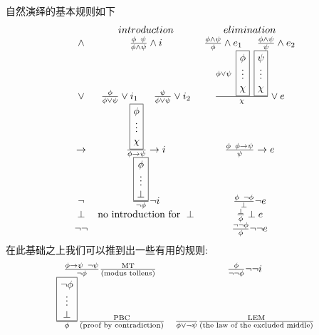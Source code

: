 \documentclass[a4paper,11pt]{article}%
\theoremstyle{remark}
\theoremstyle{remark}
\theoremstyle{definition}
\theoremstyle{definition}
\theoremstyle{plain}
\begin{document}
自然演绎的基本规则如下\[
\begin{array}{ccc}
    & introduction & elimination\\
    \land&\frac{\phi\phantom{a}\psi}{\phi\land\psi}\land i & \frac{\phi\land\psi}{\phi}\land e_1\phantom{111}\frac{\phi\land\psi}{\psi}\land e_2\\
    
    \lor&\frac{\phi}{\phi\lor\psi}\lor i_1\phantom{aaa}\frac{\psi}{\phi\lor\psi}\lor i_2 &\frac{\phi\lor\psi \phantom{a}
    \fbox{\parbox{0.25cm}{\centering
    $\phi$ \\
    $\vdots$\\
    $\chi$\\
    }}
    \phantom{a}
    \fbox{\parbox{0.25cm}{\centering
    $\psi$ \\
    $\vdots$\\
    $\chi$\\
    }}
    }{\chi}\lor e\\

    \rightarrow & \frac{\fbox{\parbox{0.25cm}{\centering
    $\phi$ \\
    $\vdots$\\
    $\chi$\\
    }}
}{\phi\rightarrow\psi}\rightarrow i& \frac{\phi\phantom{a}\phi\rightarrow\psi}{\psi}\rightarrow e\\

\lnot & \frac{\fbox{\parbox{0.3cm}{\centering
    $\phi$ \\
    $\vdots$\\
    $\perp$\\
    }}
}{\lnot\phi}\lnot i&\frac{\phi\phantom{a}\lnot \phi}{\perp}\lnot e\\

\perp & \text{no introduction for }\perp& \frac{\perp}{\phi}\perp e\\
\lnot\lnot & & \frac{\lnot \lnot \phi}{\phi}\lnot\lnot e\\
\end{array}
\]
在此基础之上我们可以推到出一些有用的规则:
\[\begin{array}{cc}
    \frac{\phi\rightarrow\psi\phantom{a}\lnot\psi}{\lnot\phi}\frac{\text{MT}}{\text{(modus tollens)}}&\frac{\phi}{\lnot\lnot\phi}\lnot\lnot i\\
    \frac{\fbox{\parbox{0.5cm}{\centering
    $\lnot\phi$ \\
    $\vdots$\\
    $\perp$\\
    }}
}{\phi}\frac{\text{PBC}}{\text{(proof by contradiction)}}&\frac{}{\phi\lor\lnot\psi}\frac{\text{LEM}}{\text{(the law of the excluded middle)}}\\
\end{array}\]
\end{document}
